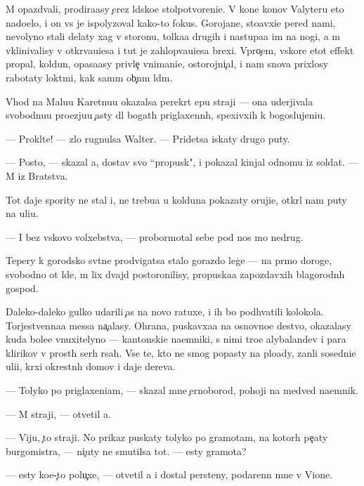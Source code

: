 \documentclass[10pt]{book}
\begin{document}
M{\yi} opazd{\yi}vali, prodira{\y}asy {\c}erez l{\iu}dsko{\y}e stolpotvoreni{\y}e. V kon{\q}e kon{\q}ov Valyteru eto nado{\y}elo, i on vs{\e} je ispolyzoval kako{\y}-to fokus. Gorojane, sto{\y}avxi{\y}e pered nami, nevolyno stali delaty xag v storonu, tolka{\y}a drugih i nastupa{\y}a im na nogi, a m{\yi} vklinivalisy v otkr{\yi}va{\y}u{\x}i{\y}esa i tut je zahlop{\yi}va{\y}u{\x}i{\y}esa brexi. Vpro{\c}em, vskore etot effekt propal, koldun, opasa{\y}asy privle{\c} vnimani{\y}e, ostorojni{\c}al, i nam snova prixlosy rabotaty lokt{\ia}mi, kak sam{\yi}m ob{\yi}{\c}n{\yi}m l{\iu}d{\ia}m.

V{\yi}hod na Malu{\y}u Karetnu{\y}u okazalsa perekr{\yi}t {\q}ep{\y}u straji — ona uderjivala svobodnu{\y}u pro{\y}ezju{\y}u {\c}asty dl{\ia} bogat{\yi}h priglaxenn{\yi}h, spexivxih k bogoslujeni{\y}u.

— Prokl{\ia}t{\y}e! — zlo rugnulsa Walter. — Pridetsa iskaty drugo{\y} puty.

— Posto{\y}, — skazal {\y}a, dostav svo{\y} ``propusk", i pokazal kinjal odnomu iz soldat. — M{\yi} iz Bratstva.

Tot daje spority ne stal i, ne trebu{\y}a u kolduna pokazaty oruji{\y}e, otkr{\yi}l nam puty na uli{\q}u.

— I bez vs{\ia}kovo volxebstva, — probormotal sebe pod nos mo{\y} nedrug.

Tepery k gorodsko{\y} sv{\ia}t{\yi}ne prodvigatsa stalo gorazdo leg{\c}e — na pr{\ia}mo{\y} doroge, svobodno{\y} ot l{\iu}de{\y}, m{\yi} lix dvajd{\yi} postoronilisy, propuska{\y}a zapozdavxih blagorodn{\yi}h gospod.

Daleko-daleko gulko udarili {\c}as{\yi} na novo{\y} ratuxe, i ih bo{\y} podhvatili kolokola. Torjestvenna{\y}a messa na{\c}alasy. Ohrana, puskavxa{\y}a na osnovno{\y}e de{\y}stvo, okazalasy kuda bole{\y}e vnuxitelyno{\y} — kantonski{\y}e na{\y}emniki, s nimi tro{\y}e alybaland{\q}ev i para klirikov v prost{\yi}h ser{\yi}h r{\ia}sah. Vse te, kto ne smog popasty na plo{\x}ady, zan{\ia}li sosedni{\y}e uli{\q}i, kr{\yi}xi okrestn{\yi}h domov i daje derev{\y}a.

— Tolyko po priglaxeni{\y}am, — skazal mne {\c}ernoborod{\yi}{\y}, pohoji{\y} na medved{\ia} na{\y}emnik.

— M{\yi} straji, — otvetil {\y}a.

— Viju, {\c}to straji. No prikaz puskaty tolyko po gramotam, na kotor{\yi}h pe{\c}aty burgomistra, — ni{\c}uty ne smutilsa tot. — {\Y}esty gramota?

— {\Y}esty ko{\y}e-{\c}to polu{\c}xe, — otvetil {\y}a i dostal persteny, podarenn{\yi}{\y} mne v Vione.
\end{document}

